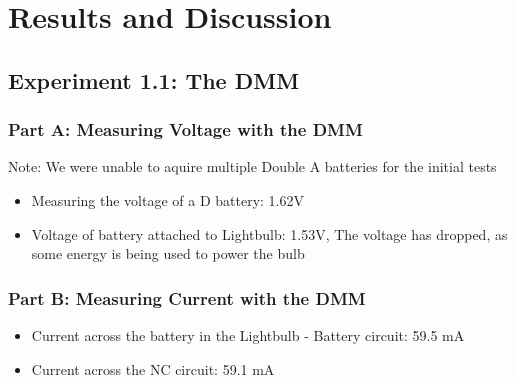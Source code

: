 \documentclass[10pt]{article}
\begin{document}
	\section{Results and Discussion}
	
	\subsection{Experiment 1.1: The DMM}
	\subsubsection{Part A: Measuring Voltage with the DMM}

	Note: We were unable to aquire multiple Double A batteries for the initial tests
	\begin{itemize}
	
	\item Measuring the voltage of a D battery: 1.62V
	\item Voltage of battery attached to Lightbulb: 1.53V, The voltage has dropped, as some energy is being used to power the bulb
	\end{itemize}

	\subsubsection{Part B: Measuring Current with the DMM}
	\begin{itemize}
	\item Current across the battery in the Lightbulb - Battery circuit: 59.5 mA
	\item Current across the NC circuit: 59.1 mA
	\end{itemize}
\end{document}
